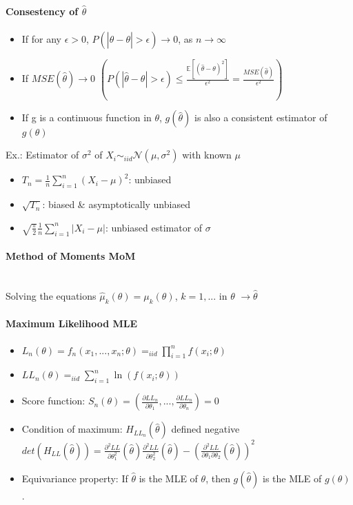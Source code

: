 \documentclass[paper=a4,fontsize=8pt,pagesize,DIV=calc]{scrartcl}
\newcounter{row}
\begin{document}
\begin{multicols}{3}
\paragraph{Consestency of $\hat{\theta}$}
\begin{itemize}
\item If for any $\epsilon >0$, $P(|\hat{\theta}-\theta|>\epsilon)\rightarrow 0$, as $n \rightarrow \infty$
\item If $MSE(\hat{\theta})\rightarrow 0$ $\left(P(|\hat{\theta}-\theta|>\epsilon) \leq \frac{\mathbb{E}[(\hat{\theta}-\theta)^2]}{\epsilon^2}=\frac{MSE(\hat{\theta})}{\epsilon^2}\right)$
\item If g is a continuous function in $\theta$, $g(\hat{\theta})$ is also a consistent estimator of $g(\theta)$
\end{itemize}
Ex.: Estimator of $\sigma^2$ of $X_i\sim_{iid}\mathcal{N}(\mu,\sigma^2)$ with known $\mu$
\begin{itemize}
\item $T_n=\frac{1}{n}\sum^n_{i=1}(X_i-\mu)^2$: unbiased
\item $\sqrt{T_n}$: biased \& asymptotically unbiased
\item $\sqrt{\frac{\pi}{2}}\frac{1}{n}\sum^n_{i=1}|X_i-\mu|$: unbiased estimator of $\sigma$
\end{itemize}
\paragraph{Method of Moments MoM}~~\\
Solving the equations $\hat{\mu}_k(\theta)=\mu_k(\theta)$, $k=1,...$ in $\theta$ $\rightarrow \hat{\theta}$ 
\paragraph{Maximum Likelihood MLE}
\begin{itemize}
\item $L_n(\theta)=f_n(x_1,...,x_n;\theta)=_{iid}\prod^n_{i=1}f(x_i;\theta)$
\item $LL_n(\theta)=_{iid}\sum^n_{i=1}\ln(f(x_i;\theta))$
\item Score function: $S_n(\theta)=(\frac{\partial LL_n}{\partial \theta_1},...,\frac{\partial LL_n}{\partial \theta_n})=0$
\item Condition of maximum: $H_{LL_n}(\hat{\theta})$ defined negative\\
$det(H_{LL}(\hat{\theta}))=\frac{\partial^2 LL}{\partial\theta_1^2}(\hat{\theta})\frac{\partial^2 LL}{\partial\theta_2^2}(\hat{\theta})-\left(\frac{\partial^2 LL}{\partial\theta_1\partial\theta_2}(\hat{\theta})\right)^2$
\item Equivariance property: If $\hat{\theta}$ is the MLE of $\theta$, then $g(\hat{\theta })$ is the MLE of $g(\theta )$.
\end{itemize}

\end{multicols}
\end{document}
